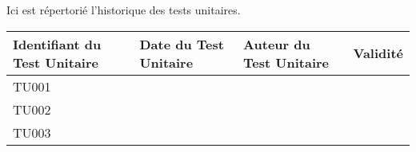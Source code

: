 
Ici est répertorié l'historique des tests unitaires. \\

\begin{table}[H]
\centering
	\begin{tabularx}{17.4cm}{|X|X|X|X|}
	\hline
	\rowcolor{gray!40} Identifiant du Test Unitaire & Date du Test Unitaire & Auteur du Test Unitaire & Validité\\
	\hline
	 TU001 & & & \\
	\hline
	 TU002 & & & \\
	 \hline
	 TU003 & & & \\
	 \hline
	\end{tabularx}
\end{table}

